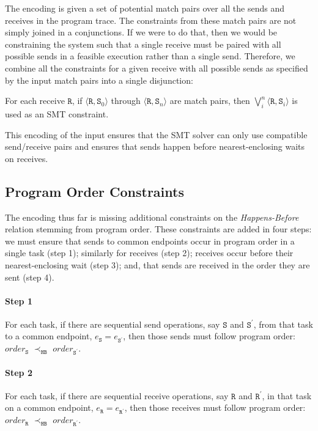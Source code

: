 The encoding is given a set of potential match pairs over all the
sends and receives in the program trace. The constraints from these
match pairs are not simply joined in a conjunctions. If we were to do that, then we
would be constraining the system such that a single receive must be
paired with all possible sends in a feasible execution rather than a
single send. Therefore, we combine all the constraints for a given
receive with all possible sends as specified by the input match pairs
into a single disjunction:

\begin{definition}
For each receive $\mathtt{R}$, if $\langle\mathtt{R},
\mathtt{S}_0\rangle$ through $\langle\mathtt{R}, \mathtt{S}_n\rangle$
are match pairs, then $\bigvee_{i}^{n} \langle\mathtt{R},
\mathtt{S}_i\rangle$ is used as an SMT constraint.
\end{definition}

This encoding of the input ensures that the SMT solver can only use
compatible send/receive pairs and ensures that sends happen before
nearest-enclosing waits on receives.

\subsection{Program Order Constraints}

The encoding thus far is missing
additional constraints on the \emph{Happens-Before} relation stemming from program order. These constraints are added in four steps: we must ensure that sends to common endpoints occur
in program order in a single task (step 1); similarly for receives
(step 2); receives occur before their nearest-enclosing wait (step 3);
and, that sends are received in the order they are sent (step 4).

\paragraph*{Step 1} For each task, if there are sequential send
operations, say $\mathtt{S}$ and $\mathtt{S^\prime}$, from that task
to a common endpoint, $e_\mathtt{S} = e_\mathtt{S^\prime}$, then those
sends must follow program order: $\mathit{order}_\mathtt{S}$
$\prec_\mathtt{HB}$ $\mathit{order}_\mathtt{S^\prime}$.

\paragraph*{Step 2} For each task, if there are sequential receive
operations, say $\mathtt{R}$ and $\mathtt{R^\prime}$, in that task
on a common endpoint, $e_\mathtt{R} = e_\mathtt{R^\prime}$, then those
receives must follow program order: $\mathit{order}_\mathtt{R}$
$\prec_\mathtt{HB}$ $\mathit{order}_\mathtt{R^\prime}$.

